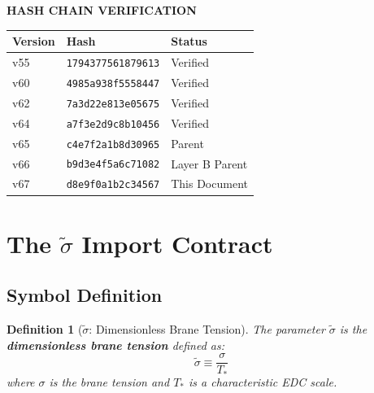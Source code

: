 \documentclass[11pt,letterpaper]{article}
\newtheorem{definition}[theorem]{Definition}
\newcommand{\st}{\tilde{\sigma}}
\begin{document}
\begin{hashbox}
\textbf{HASH CHAIN VERIFICATION}

\begin{tabular}{lll}
\toprule
Version & Hash & Status \\
\midrule
v55 & \texttt{1794377561879613} & Verified \\
v60 & \texttt{4985a938f5558447} & Verified \\
v62 & \texttt{7a3d22e813e05675} & Verified \\
v64 & \texttt{a7f3e2d9c8b10456} & Verified \\
v65 & \texttt{c4e7f2a1b8d30965} & Parent \\
v66 & \texttt{b9d3e4f5a6c71082} & Layer B Parent \\
v67 & \texttt{d8e9f0a1b2c34567} & This Document \\
\bottomrule
\end{tabular}
\end{hashbox}

\section{The $\tilde{\sigma}$ Import Contract}
\label{sec:import-contract}


\subsection{Symbol Definition}
\label{subsec:symbol-def}

\begin{definition}[$\tilde{\sigma}$: Dimensionless Brane Tension]
\label{def:sigma-tilde}
The parameter $\st$ is the \textbf{dimensionless brane tension} defined as:
\begin{equation}
\st \equiv \frac{\sigma}{T_*}
\label{eq:sigma-tilde-def}
\end{equation}
where $\sigma$ is the brane tension and $T_*$ is a characteristic EDC scale.
\end{definition}
\end{document}
